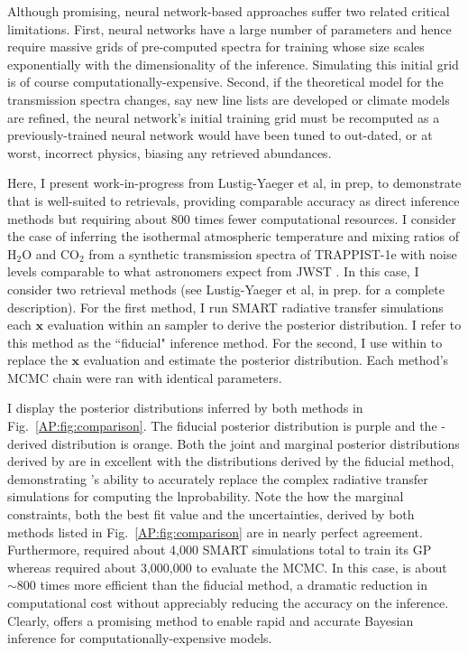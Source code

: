 Although promising, neural network-based approaches suffer two related critical limitations. First, neural networks have a large number of parameters and hence require massive grids of pre-computed spectra for training whose size scales exponentially with the dimensionality of the inference. Simulating this initial grid is of course computationally-expensive. Second, if the theoretical model for the transmission spectra changes, say new line lists are developed or climate models are refined, the neural network's initial training grid must be recomputed as a previously-trained neural network would have been tuned to out-dated, or at worst, incorrect physics, biasing any retrieved abundances. 

Here, I present work-in-progress from Lustig-Yaeger et al, in prep, to demonstrate that \approxposterior is well-suited to retrievals, providing comparable accuracy as direct inference methods but requiring about 800 times fewer computational resources. I consider the case of inferring the isothermal atmospheric temperature and mixing ratios of H$_2$O and CO$_2$ from a synthetic transmission spectra of TRAPPIST-1e with noise levels comparable to what astronomers expect from JWST \citep{Lincowski2018}. In this case, I consider two retrieval methods (see Lustig-Yaeger et al, in prep. for a complete description). For the first method, I run SMART radiative transfer simulations each $\textbf{x}$ evaluation within an \emcee sampler to derive the posterior distribution. I refer to this method as the ``fiducial" inference method. For the second, I use \approxposterior within \emcee to replace the $\textbf{x}$ evaluation and estimate the posterior distribution. Each method's MCMC chain were ran with identical parameters. 

I display the posterior distributions inferred by both methods in Fig.~\ref{AP:fig:comparison}. The fiducial posterior distribution is purple and the \approxposterior-derived distribution is orange. Both the joint and marginal posterior distributions derived by \approxposterior are in excellent with the distributions derived by the fiducial method, demonstrating \approxposterior's ability to accurately replace the complex radiative transfer simulations for computing the lnprobability. Note the how the marginal constraints, both the best fit value and the uncertainties, derived by both methods listed in Fig.~\ref{AP:fig:comparison} are in nearly perfect agreement. Furthermore, \approxposterior required about 4,000 SMART simulations total to train its GP whereas \emcee required about 3,000,000 to evaluate the MCMC. In this case, \approxposterior is about ${\sim}800$ times more efficient than the fiducial method, a dramatic reduction in computational cost without appreciably reducing the accuracy on the inference. Clearly, \approxposterior offers a promising method to enable rapid and accurate Bayesian inference for computationally-expensive models.

